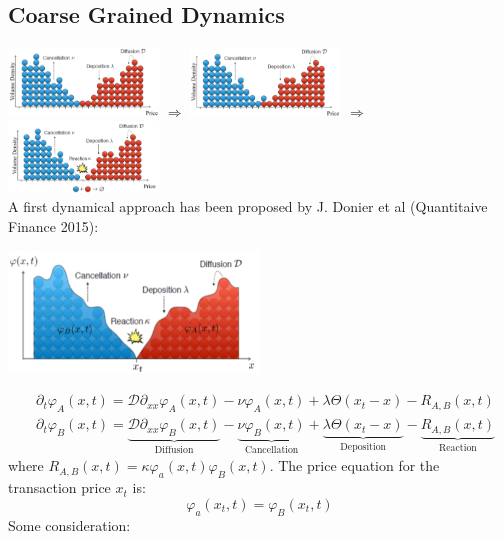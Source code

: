 \subsection{Coarse Grained Dynamics}
\includegraphics[width=0.3\textwidth]{picture/(30)react_diff_1.png} $\Rightarrow$ \includegraphics[width=0.3\textwidth]{picture/(31)react_diff_2.png}  $\Rightarrow$ \includegraphics[width=0.3\textwidth]{picture/(32)react_diff_3.png}\\
A first dynamical approach has been proposed by J. Donier et al (Quantitaive Finance 2015):
\begin{center}
	\includegraphics[width=0.5\textwidth]{picture/(33)coarse_grained_dynamics.png}
\end{center}
\begin{align*}
	&\partial_t \varphi_A(x,t) = \mathcal{D} \partial_{xx} \varphi_A(x,t) - \nu \varphi_A(x,t) + \lambda \Theta(x_t -x) - R_{A,B}(x,t)\\
	&\partial_t \varphi_B (x,t) = \underbrace{\mathcal{D} \partial_{xx} \varphi_B(x,t)}_{\text{Diffusion}} - \underbrace{\nu \varphi_B(x,t)}_{\text{Cancellation}} + \underbrace{ \lambda \Theta(x_t -x)}_{\text{Deposition}} - \underbrace{R_{A,B}(x,t)}_{\text{Reaction}}
\end{align*}
where $R_{A,B}(x,t) = \kappa \varphi_a(x,t) \varphi_B(x,t)$. The price equation for the transaction price $x_t$ is:
\[
\varphi_a(x_t,t) = \varphi_B (x_t,t)
\]
Some consideration:
